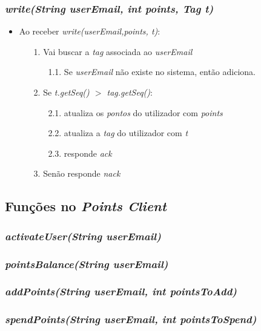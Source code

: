 \documentclass[a4paper]{article}
\begin{document}
\subsubsection{\textit{write(String userEmail, int points, Tag t)}}
\begin{itemize}
\item Ao receber \textit{write(userEmail,points, t)}:
\begin{itemize}
\item[1.] Vai buscar a \textit{tag} associada ao \textit{userEmail}
\begin{itemize}
\item[1.1.] Se \textit{userEmail} não existe no sistema, então adiciona.
\end{itemize}
\item[2.] Se \textit{t.getSeq() $>$ tag.getSeq()}:
\begin{itemize}
\item[2.1.] atualiza os \textit{pontos} do utilizador com \textit{points}
\item[2.2.] atualiza a \textit{tag} do utilizador com \textit{t}
\item[2.3.] responde \textit{ack}
\end{itemize}
\item[3.] Senão responde \textit{nack}
\end{itemize}
\end{itemize}
\subsection{Funções no \textit{Points Client}}
\subsubsection{\textit{activateUser(String userEmail)}}
\subsubsection{\textit{pointsBalance(String userEmail)}}
\subsubsection{\textit{addPoints(String userEmail, int pointsToAdd)}}
\subsubsection{\textit{spendPoints(String userEmail, int pointsToSpend)}}
\end{document}

